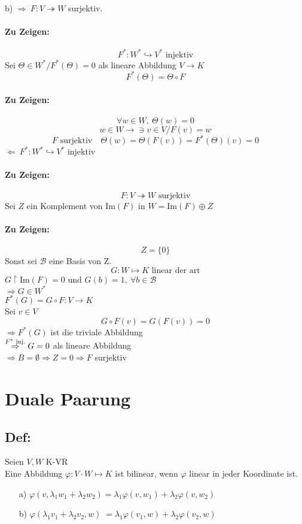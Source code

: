 \documentclass[titlepage,12pt,a4paper,ngerman]{report}
\newcommand{\tx}[1]{\textrm{#1}}
\begin{document}
b) $\boxed{\Rightarrow}\ F: V \twoheadrightarrow W$ surjektiv.
\paragraph{Zu Zeigen:} $$F^* : W^* \hookrightarrow V^* \tx{ injektiv}$$
Sei $\Theta \in W^* / F^* (\Theta) = 0$ als lineare Abbildung $V \to K$
$$F^* (\Theta) = \Theta \circ F$$
\paragraph{Zu Zeigen:} $$\forall w \in W,\ \Theta(w) = 0$$
$$w \in W \to \ni v \in V / F(v) = w$$
$$F \tx{ surjektiv} \quad \Theta(w) = \Theta(F(v)) = F^*(\Theta)(v) = 0 $$
$\boxed{\Leftarrow}\ F^* : W^* \hookrightarrow V^*$ injektiv
\paragraph{Zu Zeigen:} $$ F: V \twoheadrightarrow W \tx{ surjektiv}$$
Sei $Z$ ein Komplement von Im$(F)$ in $W=$Im$(F) \oplus Z$
\paragraph{Zu Zeigen:} $$Z = \{0\} $$
Sonst sei $\mathcal B$ eine Basis von Z. 
$$G: W \mapsto K \tx{ linear der art}$$
$G \upharpoonright$Im$(F) = 0$ und $G(b) = 1,\ \forall b \in \mathcal B$\\
$ \Rightarrow G \in W^* $\\
$ F^*(G) = G \circ F : V \to K $\\
Sei $ v \in V $
$$ G \circ F(v) = G(F(v)) = 0 $$
$\Rightarrow F^*(G) $ ist die triviale Abbildung\\
$ \buildrel F^* \tx{ inj.} \over \Rightarrow G =0 $ als lineare Abbildung\\
$ \Rightarrow B = \emptyset \Rightarrow Z = 0 \Rightarrow F $ surjektiv

\section{Duale Paarung}
\subsection{Def:}
Seien $ V,W $ K-VR\\
Eine Abbildung $ \varphi: V \cdot W \mapsto K $ ist bilinear, wenn $ \varphi $ linear in jeder Koordinate ist.
\begin{itemize}
	\item[a)] $ \varphi(v, \lambda_1w_1 + \lambda_2 w_2) = \lambda_1 \varphi(v, w_1) + \lambda_2 \varphi(v,w_2) $
	\item[b)] $ \varphi(\lambda_1 v_1 + \lambda_2 v_2, w) \;= \lambda_1 \varphi(v_1,w) + \lambda_2 \varphi(v_2,w) $
\end{itemize}
\end{document}
